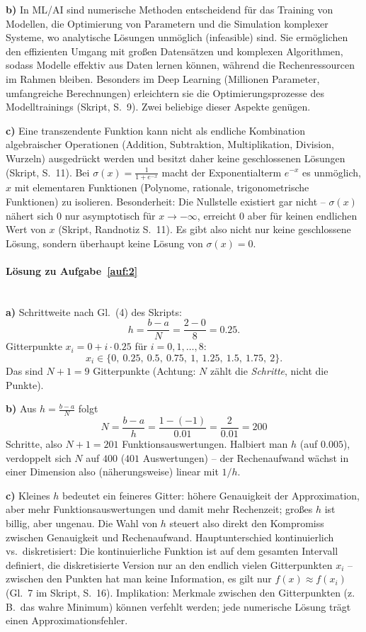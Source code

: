 \documentclass[11pt,a4paper]{scrartcl}
\begin{document}
\textbf{b)} In ML/AI sind numerische Methoden entscheidend für das Training von Modellen,
die Optimierung von Parametern und die Simulation komplexer Systeme, wo analytische
Lösungen unmöglich (infeasible) sind. Sie ermöglichen den effizienten Umgang mit großen
Datensätzen und komplexen Algorithmen, sodass Modelle effektiv aus Daten lernen können,
während die Rechenressourcen im Rahmen bleiben. Besonders im Deep Learning (Millionen
Parameter, umfangreiche Berechnungen) erleichtern sie die Optimierungsprozesse des
Modelltrainings (Skript, S.~9). Zwei beliebige dieser Aspekte genügen.

\textbf{c)} Eine transzendente Funktion kann nicht als endliche Kombination algebraischer
Operationen (Addition, Subtraktion, Multiplikation, Division, Wurzeln) ausgedrückt werden
und besitzt daher keine geschlossenen Lösungen (Skript, S.~11). Bei
$\sigma(x) = \frac{1}{1+e^{-x}}$ macht der Exponentialterm $e^{-x}$ es unmöglich, $x$ mit
elementaren Funktionen (Polynome, rationale, trigonometrische Funktionen) zu isolieren.
Besonderheit: Die Nullstelle existiert gar nicht -- $\sigma(x)$ nähert sich $0$ nur
asymptotisch für $x \to -\infty$, erreicht $0$ aber für keinen endlichen Wert von $x$
(Skript, Randnotiz S.~11). Es gibt also nicht nur keine geschlossene Lösung, sondern
überhaupt keine Lösung von $\sigma(x) = 0$.

\paragraph{Lösung zu Aufgabe~\ref{auf:2}}\mbox{}\\[2pt]
\textbf{a)} Schrittweite nach Gl.~(4) des Skripts:
\[
h = \frac{b-a}{N} = \frac{2-0}{8} = 0.25 .
\]
Gitterpunkte $x_i = 0 + i \cdot 0.25$ für $i = 0, 1, \ldots, 8$:
\[
x_i \in \{0,\ 0.25,\ 0.5,\ 0.75,\ 1,\ 1.25,\ 1.5,\ 1.75,\ 2\}.
\]
Das sind $N + 1 = 9$ Gitterpunkte (Achtung: $N$ zählt die \emph{Schritte}, nicht die
Punkte).

\textbf{b)} Aus $h = \frac{b-a}{N}$ folgt
\[
N = \frac{b-a}{h} = \frac{1-(-1)}{0.01} = \frac{2}{0.01} = 200
\]
Schritte, also $N + 1 = 201$ Funktionsauswertungen. Halbiert man $h$ (auf $0.005$),
verdoppelt sich $N$ auf $400$ ($401$ Auswertungen) -- der Rechenaufwand wächst in einer
Dimension also (näherungsweise) linear mit $1/h$.

\textbf{c)} Kleines $h$ bedeutet ein feineres Gitter: höhere Genauigkeit der Approximation,
aber mehr Funktionsauswertungen und damit mehr Rechenzeit; großes $h$ ist billig, aber
ungenau. Die Wahl von $h$ steuert also direkt den Kompromiss zwischen Genauigkeit und
Rechenaufwand. Hauptunterschied kontinuierlich vs.\ diskretisiert: Die kontinuierliche
Funktion ist auf dem gesamten Intervall definiert, die diskretisierte Version nur an den
endlich vielen Gitterpunkten $x_i$ -- zwischen den Punkten hat man keine Information,
es gilt nur $f(x) \approx f(x_i)$ (Gl.~7 im Skript, S.~16). Implikation: Merkmale zwischen
den Gitterpunkten (z.\,B.\ das wahre Minimum) können verfehlt werden; jede numerische
Lösung trägt einen Approximationsfehler.
\end{document}
